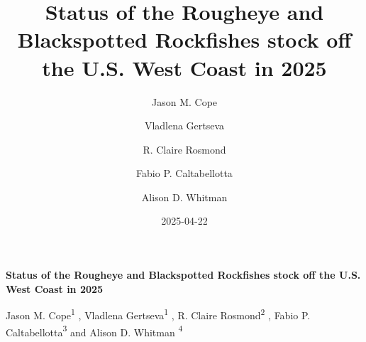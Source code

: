 \documentclass[
]{scrartcl}
\title{Status of the Rougheye and Blackspotted Rockfishes stock off the
U.S. West Coast in 2025}
\author{Jason M. Cope \and Vladlena Gertseva \and R. Claire
Rosmond \and Fabio P. Caltabellotta \and Alison D. Whitman}
\date{2025-04-22}
\begin{document}
  \begin{titlepage}

  \begin{minipage}[b][\textheight][s]{\textwidth}


  \raggedright




  {\huge\bfseries\nohyphens{Status of the Rougheye and Blackspotted
  Rockfishes stock off the U.S. West Coast in 2025}}\\[1\baselineskip]



  \vspace{1\baselineskip}


  \vspace{1\baselineskip}

   {\large{Jason M. Cope}}{\textsuperscript{1}}%
  ,
   {\large{Vladlena Gertseva}}{\textsuperscript{1}}%
  ,
   {\large{R. Claire Rosmond}}{\textsuperscript{2}}%
  ,
   {\large{Fabio P. Caltabellotta}}{\textsuperscript{3}}%
  { and \large{Alison D. Whitman}}%
  {\textsuperscript{4}}%



  \vspace{2\baselineskip}


\end{minipage}
\end{titlepage}
\end{document}

